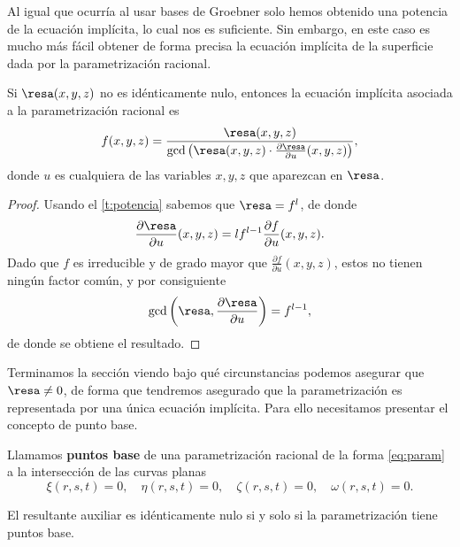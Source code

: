 Al igual que ocurría al usar bases de Groebner solo hemos obtenido una potencia de la ecuación implícita, lo cual nos es suficiente. Sin embargo, en este caso es mucho más fácil obtener de forma precisa la ecuación implícita de la superficie dada por la parametrización racional.
\begin{teorema}\label{t:resDef}
    Si $\resa(x,y,z)$ no es idénticamente nulo, entonces la ecuación implícita asociada a la parametrización racional es
    \begin{equation*}
        f(x,y,z) = \frac{\resa(x,y,z)}{\gcd\left( \resa(x,y,z)\cdot \frac{\partial \resa}{\partial u}(x,y,z)  \right)},
    \end{equation*}
    donde $u$ es cualquiera de las variables $x,y,z$ que aparezcan en $\resa$.  
\end{teorema}
\begin{proof}
    Usando el \autoref{t:potencia} sabemos que $\resa = f^l$, de donde
    \begin{equation*}
         \frac{\partial \resa}{\partial u}(x,y,z) = lf^{l-1} \frac{\partial f}{\partial u}(x,y,z).
    \end{equation*}
    Dado que $f$ es irreducible y de grado mayor que $ \frac{\partial f}{\partial u}(x,y,z)$, estos no tienen ningún factor común, y por consiguiente
    \begin{equation*}
        \gcd\left( \resa, \frac{\partial \resa}{\partial u}\right) = f^{l-1},
    \end{equation*}
    de donde se obtiene el resultado.
\end{proof}

Terminamos la sección viendo bajo qué circunstancias podemos asegurar que $\resa \neq 0$, de forma que tendremos asegurado que la parametrización es representada por una única ecuación implícita. Para ello necesitamos presentar el concepto de punto base.
\begin{definicion}
    Llamamos \textbf{puntos base} de una parametrización racional de la forma \eqref{eq:param} a la intersección de las curvas planas
    \begin{equation*}
       \xi(r,s,t) = 0,\quad \eta(r,s,t) = 0,\quad \zeta(r,s,t)=0,\quad \omega(r,s,t)=0.
    \end{equation*}
\end{definicion}
\begin{teorema}
    El resultante auxiliar es idénticamente nulo si y solo si la parametrización tiene puntos base.
\end{teorema}

